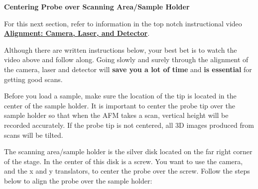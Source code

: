 \documentclass{../lab}
\begin{document}
\textbf{Centering Probe over Scanning Area/Sample Holder}

For this next section, refer to information in the top notch instructional video  \href{http://experimentationlab.berkeley.edu/sites/default/files/alignment\_final2.mp4}{\textbf{Alignment: Camera, Laser, and Detector}}.

Although there are written instructions below, your best bet is to watch the video above and follow along. Going slowly and surely through the alignment of the camera, laser and detector will \textbf{save you a lot of time} and \textbf{is essential} for getting good scans.

Before you load a sample, make sure the location of the tip is located in the center of the sample holder.  It is important to center the probe tip over the sample holder so that when the AFM takes a scan, vertical height will be recorded accurately.  If the probe tip is not centered, all 3D images produced from scans will be tilted.

The scanning area/sample holder is the silver disk located on the far right corner of the stage.  In the center of this disk is a screw.  You want to use the camera, and the x and y translators, to center the probe over the screw.  Follow the steps below to align the probe over the sample holder:
\end{document}
